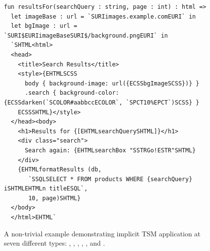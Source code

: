 \begin{figure}[h]
\begin{lstlisting}[deletekeywords={for}, escapechar=@]
fun resultsFor(searchQuery : string, page : int) : html => 
  let imageBase : url = `SURIimages.example.comEURI` in 
  let bgImage : url = `SURI$EURIimageBaseSURI$/background.pngEURI` in 
  `SHTML<html>
  <head>
    <title>Search Results</title>
    <style>{EHTMLSCSS
      body { background-image: url({ECSSbgImageSCSS})} }
      .search { background-color: {ECSSdarken(`SCOLOR#aabbccECOLOR`, `SPCT10%EPCT`)SCSS} }
    ECSSSHTML}</style>
  </head><body>
    <h1>Results for {[EHTMLsearchQuerySHTML]}</h1>
    <div class="search">
      Search again: {EHTMLsearchBox "SSTRGo!ESTR"SHTML}
    </div>
    {EHTMLformatResults (db, 
       `SSQLSELECT * FROM products WHERE {searchQuery} iSHTMLEHTMLn titleESQL`,
       10, page)SHTML}
  </body>
  </html>EHTML`
\end{lstlisting}
\caption{A non-trivial example demonstrating implicit TSM application at seven different types: , , , , ,  and .}
\label{fig:big-html-example}
\end{figure}


